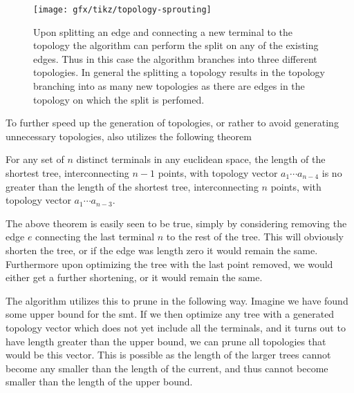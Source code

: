 \begin{figure}[htbp]
  \centering
  \texttt{[image: gfx/tikz/topology-sprouting]}
  \caption[Splitting of an edge]{Upon splitting an edge and connecting a new
    terminal to the topology the algorithm can perform the split on any of the
    existing edges. Thus in this case the algorithm branches into three
    different topologies. In general the splitting a topology results in the topology
    branching into as many new topologies as there are edges in the topology on which
    the split is perfomed.\label{fig:topology-sprouting}}
\end{figure}

To further speed up the generation of topologies, or rather to avoid generating
unnecessary topologies, \citeauthor{smith1992} also utilizes the following theorem
%
\begin{theorem}
  For any set of $n$ distinct terminals in any euclidean space, the length of
  the shortest tree, interconnecting $n-1$ points, with topology vector
  $a_1 \cdots a_{n-4}$ is no greater than the length of the shortest tree,
  interconnecting $n$ points, with topology vector $a_1 \cdots a_{n-3}$.
\end{theorem}
%
The above theorem is easily seen to be true, simply by considering removing the
edge $e$ connecting the last terminal $n$ to the rest of the tree. This will
obviously shorten the tree, or if the edge was length zero it would remain the
same. Furthermore upon optimizing the tree with the last point removed, we
would either get a further shortening, or it would remain the same.


The algorithm utilizes this to prune in the following way. Imagine we have
found some upper bound for the \ac{smt}. If we then optimize any tree with a generated
topology vector which does not yet include all the terminals, and it turns out
to have length greater than the upper bound, we can prune all topologies that
would be this vector. This is possible as the length of the larger trees
cannot become any smaller than the length of the current, and thus cannot become
smaller than the length of the upper bound.

